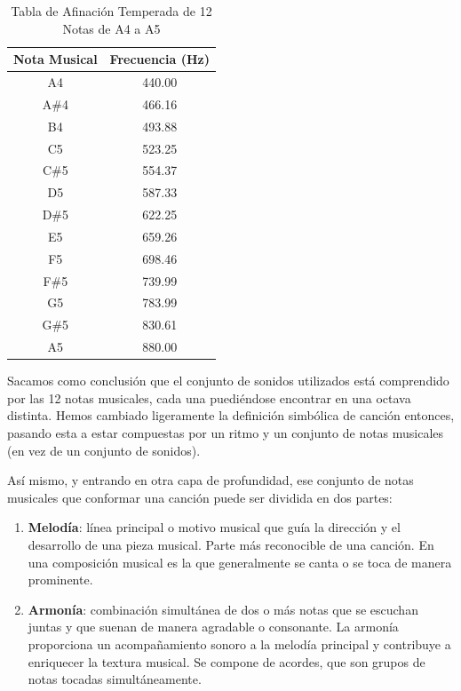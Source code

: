 \begin{table}[h]
    \centering
    \begin{tabular}{c|c}
        \textbf{Nota Musical} & \textbf{Frecuencia (Hz)} \\
        \hline
        A4 & 440.00 \\
        A\#4 & 466.16 \\
        B4 & 493.88 \\
        C5 & 523.25 \\
        C\#5 & 554.37 \\
        D5 & 587.33 \\
        D\#5 & 622.25 \\
        E5 & 659.26 \\
        F5 & 698.46 \\
        F\#5 & 739.99 \\
        G5 & 783.99 \\
        G\#5 & 830.61 \\
        A5 & 880.00 \\
    \end{tabular}
    \caption{Tabla de Afinación Temperada de 12 Notas de A4 a A5}
    \label{tab:temperedTuningTable_A4_A5}
\end{table}

        Sacamos como conclusión que el conjunto de sonidos utilizados está comprendido por las 12 notas musicales, cada una puediéndose encontrar en una octava distinta. Hemos cambiado ligeramente la definición simbólica de canción entonces, pasando esta a estar compuestas por un ritmo y un conjunto de notas musicales (en vez de un conjunto de sonidos).  

        Así mismo, y entrando en otra capa de profundidad, ese conjunto de notas musicales que conformar una canción puede ser dividida en dos partes:

        \begin{enumerate}
            \item[\textbullet] \textbf{Melodía}: línea principal o motivo musical que guía la dirección y el desarrollo de una pieza musical. Parte más reconocible de una canción. En una composición musical es la que generalmente se canta o se toca de manera prominente.
            \item[\textbullet] \textbf{Armonía}: combinación simultánea de dos o más notas que se escuchan juntas y que suenan de manera agradable o consonante. La armonía proporciona un acompañamiento sonoro a la melodía principal y contribuye a enriquecer la textura musical. Se compone de acordes, que son grupos de notas tocadas simultáneamente.

        \end{enumerate}

